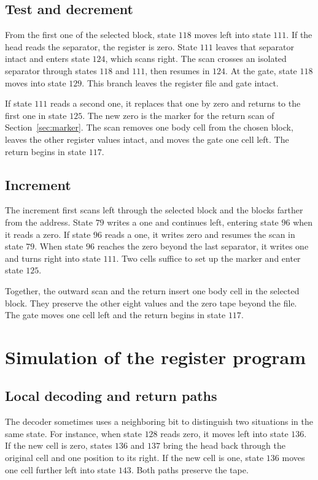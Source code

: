 \documentclass[11pt,letterpaper]{article}
\begin{document}
\subsection{Test and decrement}

From the first one of the selected block, state $118$ moves left
into state $111$. If the head reads the separator, the register
is zero. State $111$ leaves that separator intact and enters
state $124$, which scans right. The scan crosses an isolated
separator through states $118$ and $111$, then resumes in $124$.
At the gate, state $118$ moves into state $129$. This branch
leaves the register file and gate intact.

If state $111$ reads a second one, it replaces that one by zero
and returns to the first one in state $125$. The new zero is the
marker for the return scan of Section~\ref{sec:marker}.
The scan removes one body cell from the chosen block, leaves the
other register values intact, and moves the gate one cell left.
The return begins in state $117$.

\subsection{Increment}

The increment first scans left through the selected block and
the blocks farther from the address. State $79$ writes a one and
continues left, entering state $96$ when it reads a zero. If state
$96$ reads a one, it writes zero and resumes the scan in state $79$.
When state $96$ reaches the zero beyond the last separator,
it writes one and turns right into state $111$. Two cells suffice
to set up the marker and enter state $125$.

Together, the outward scan and the return insert one body cell in
the selected block. They preserve the other eight values and the
zero tape beyond the file. The gate moves one cell left and the
return begins in state $117$.

\section{Simulation of the register program}\label{sec:simulation}

\subsection{Local decoding and return paths}

The decoder sometimes uses a neighboring bit to distinguish two
situations in the same state. For instance, when state $128$ reads
zero, it moves left into state $136$. If the new cell is zero,
states $136$ and $137$ bring the head back through the original
cell and one position to its right. If the new cell is one,
state $136$ moves one cell further left into state $143$. Both
paths preserve the tape.
\end{document}
